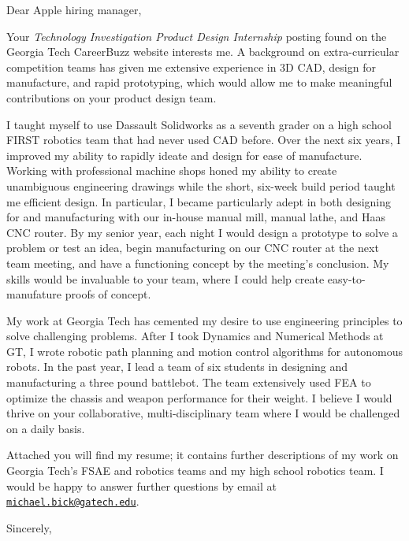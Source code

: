 \documentclass[12pt]{cover_letter}
\date{March 4, 2018}
\begin{document}
  \begin{letter}{}

    \opening{Dear Apple hiring manager,}

    \thispagestyle{fancy}

    Your \textit{Technology Investigation Product Design Internship} posting found on the Georgia Tech CareerBuzz website interests me. A background on extra-curricular competition teams has given me extensive experience in 3D CAD, design for manufacture, and rapid prototyping, which would allow me to make meaningful contributions on your product design team.

    I taught myself to use Dassault Solidworks as a seventh grader on a high school FIRST robotics team that had never used CAD before. Over the next six years, I improved my ability to rapidly ideate and design for ease of manufacture. Working with professional machine shops honed my ability to create unambiguous engineering drawings while the short, six-week build period taught me efficient design. In particular,  I became particularly adept in both designing for and manufacturing with our in-house manual mill, manual lathe, and Haas CNC router. By my senior year, each night I would design a prototype to solve a problem or test an idea, begin manufacturing on our CNC router at the next team meeting, and have a functioning concept by the meeting's conclusion. My skills would be invaluable to your team, where I could help create easy-to-manufature proofs of concept.

    My work at Georgia Tech has cemented my desire to use engineering principles to solve challenging problems. After I took Dynamics and Numerical Methods at GT, I wrote robotic path planning and motion control algorithms for autonomous robots. In the past year, I lead a team of six students in designing and manufacturing a three pound battlebot. The team extensively used FEA to optimize the chassis and weapon performance for their weight. I believe I would thrive on your collaborative, multi-disciplinary team where I would be challenged on a daily basis.

    Attached you will find my resume; it contains further descriptions of my work on Georgia Tech's FSAE and robotics teams and my high school robotics team. I would be happy to answer further questions by email at \href{mailto:michael.bick@gatech.edu}{\nolinkurl{michael.bick@gatech.edu}}.

    \closing{Sincerely,}

  \end{letter}

  
\end{document}
